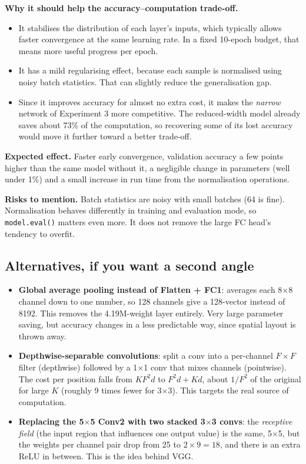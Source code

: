 \documentclass[11pt]{article}
\newcommand{\key}[1]{\textbf{#1}}
\begin{document}
\key{Why it should help the accuracy--computation trade-off.}
\begin{itemize}[noitemsep]
\item It stabilises the distribution of each layer's inputs, which typically allows faster convergence at the same learning rate. In a fixed 10-epoch budget, that means more useful progress per epoch.
\item It has a mild regularising effect, because each sample is normalised using noisy batch statistics. That can slightly reduce the generalisation gap.
\item Since it improves accuracy for almost no extra cost, it makes the \emph{narrow} network of Experiment 3 more competitive. The reduced-width model already saves about 73\% of the computation, so recovering some of its lost accuracy would move it further toward a better trade-off.
\end{itemize}

\key{Expected effect.} Faster early convergence, validation accuracy a few points higher than the same model without it, a negligible change in parameters (well under 1\%) and a small increase in run time from the normalisation operations.

\key{Risks to mention.} Batch statistics are noisy with small batches (64 is fine). Normalisation behaves differently in training and evaluation mode, so \texttt{model.eval()} matters even more. It does not remove the large FC head's tendency to overfit.

\subsection{Alternatives, if you want a second angle}

\begin{itemize}[noitemsep]
\item \key{Global average pooling instead of Flatten + FC1}: averages each 8$\times$8 channel down to one number, so 128 channels give a 128-vector instead of 8192. This removes the 4.19M-weight layer entirely. Very large parameter saving, but accuracy changes in a less predictable way, since spatial layout is thrown away.
\item \key{Depthwise-separable convolutions}: split a conv into a per-channel $F\times F$ filter (depthwise) followed by a 1$\times$1 conv that mixes channels (pointwise). The cost per position falls from $K F^2 d$ to $F^2 d + K d$, about $1/F^2$ of the original for large $K$ (roughly 9 times fewer for 3$\times$3). This targets the real source of computation.
\item \key{Replacing the 5$\times$5 Conv2 with two stacked 3$\times$3 convs}: the \emph{receptive field} (the input region that influences one output value) is the same, 5$\times$5, but the weights per channel pair drop from 25 to $2\times 9=18$, and there is an extra ReLU in between. This is the idea behind VGG.
\end{itemize}
\end{document}
